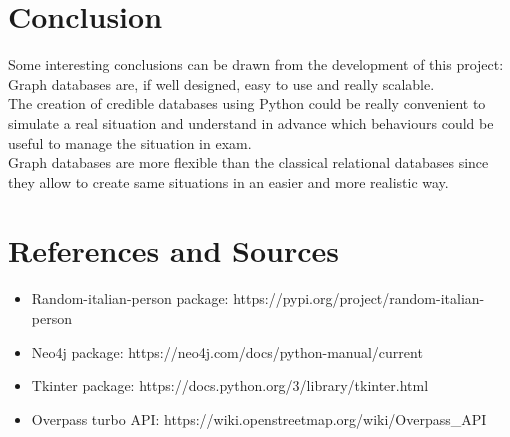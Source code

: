 \documentclass{article}
\begin{document}
\newpage

\section{Conclusion}

Some interesting conclusions can be drawn from the development of this project: Graph databases are, if well designed, easy to use and really scalable. \\
The creation of credible databases using Python could be really convenient to simulate a real situation and understand in advance which behaviours could be useful to manage the situation in exam.\\
Graph databases are more flexible than the classical relational databases since they allow to create same situations in an easier and more realistic way.

\section{References and Sources}
\begin{itemize}
    \item Random-italian-person package: https://pypi.org/project/random-italian-person
    \item Neo4j package: https://neo4j.com/docs/python-manual/current
    \item Tkinter package: https://docs.python.org/3/library/tkinter.html
    \item Overpass turbo API: https://wiki.openstreetmap.org/wiki/Overpass\_API
\end{itemize}
\end{document}
